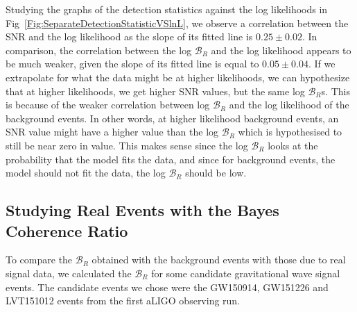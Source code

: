 \documentclass{article}
\begin{document}
     Studying the graphs of the detection statistics against the log likelihoods in Fig~\ref{Fig:SeparateDetectionStatisticVSlnL}, we observe a correlation between the SNR and the log likelihood as the slope of its fitted line is $0.25\pm0.02$. In comparison, the correlation between the log $\mathcal{B}_{R}$ and the log likelihood appears to be much weaker, given the slope of its fitted line is equal to $0.05\pm0.04$. If we extrapolate for what the data might be at higher likelihoods, we can hypothesize that at higher likelihoods, we get higher SNR values, but the same log $\mathcal{B}_{R}$s. This is because of the weaker correlation between log $\mathcal{B}_{R}$ and the log likelihood of the background events. In other words, at higher likelihood background events, an SNR value might have a higher value than the log $\mathcal{B}_{R}$ which is hypothesised to still be near zero in value. This makes sense since the log $\mathcal{B}_{R}$ looks at the probability that the model fits the data, and since for background events, the model should not fit the data, the log $\mathcal{B}_{R}$ should be low.  \\ 
     
 
 
 \subsection{Studying Real Events with the Bayes Coherence Ratio}
 
 
 
 To compare the $\mathcal{B}_{R}$ obtained with the background events with those due to real signal data, we calculated the $\mathcal{B}_{R}$ for some candidate gravitational wave signal events. The candidate events we chose were the GW150914, GW151226 and LVT151012 events from the first aLIGO observing run.
 
 
 
 
\end{document}
